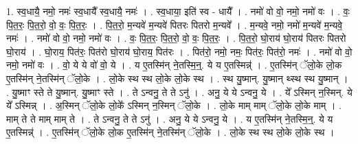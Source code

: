 \documentclass[17pt]{extarticle}
\begin{document}
1. स्व॒धायै॒ नमो॒ नमः॑ स्व॒धायै᳚ स्व॒धायै॒ नमः॑ । . स्व॒धाया॒ इति॑ स्व - धायै᳚ । . नमो॑ वो वो॒ नमो॒ नमो॑ वः । . वः॒ पि॒त॒रः॒ पि॒त॒रो॒ वो॒ वः॒ पि॒त॒रः॒ । . पि॒त॒रो॒ म॒न्यवे॑ म॒न्यवे॑ पितरः पितरो म॒न्यवे᳚ । . म॒न्यवे॒ नमो॒ नमो॑ म॒न्यवे॑ म॒न्यवे॒ नमः॑ । . नमो॑ वो वो॒ नमो॒ नमो॑ वः । . वः॒ पि॒त॒रः॒ पि॒त॒रो॒ वो॒ वः॒ पि॒त॒रः॒ । . पि॒त॒रो॒ घो॒राय॑ घो॒राय॑ पितरः पितरो घो॒राय॑ । . घो॒राय॒ पित॑रः॒ पित॑रो घो॒राय॑ घो॒राय॒ पित॑रः । . पित॑रो॒ नमो॒ नमः॒ पित॑रः॒ पित॑रो॒ नमः॑ । . नमो॑ वो वो॒ नमो॒ नमो॑ वः । . वो॒ ये ये वो॑ वो॒ ये । . य ए॒तस्मि॑न् ने॒तस्मि॒न्॒. ये य ए॒तस्मिन्न्॑ । . ए॒तस्मि॑न् ॅलो॒के लो॒क ए॒तस्मि॑न् ने॒तस्मि॑न् ॅलो॒के । . लो॒के स्थ स्थ लो॒के लो॒के स्थ । . स्थ यु॒ष्मान्. यु॒ष्मान् थ्स्थ स्थ यु॒ष्मान् । . यु॒ष्माꣳ स्ते ते यु॒ष्मान्. यु॒ष्माꣳ स्ते । . ते ऽन्वनु॒ ते ते ऽनु॑ । . अनु॒ ये ये ऽन्वनु॒ ये । . ये᳚ ऽस्मिन् न॒स्मिन्. ये ये᳚ ऽस्मिन्न् । . अ॒स्मिन् ॅलो॒के लो॒के᳚ ऽस्मिन् न॒स्मिन् ॅलो॒के । . लो॒के माम् माम् ॅलो॒के लो॒के माम् । . माम् ते ते माम् माम् ते । . ते ऽन्वनु॒ ते ते ऽनु॑ । . अनु॒ ये ये ऽन्वनु॒ ये । . य ए॒तस्मि॑न् ने॒तस्मि॒न्॒. ये य ए॒तस्मिन्न्॑ । . ए॒तस्मि॑न् ॅलो॒के लो॒क ए॒तस्मि॑न् ने॒तस्मि॑न् ॅलो॒के । . लो॒के स्थ स्थ लो॒के लो॒के स्थ । \newline
\end{document}
